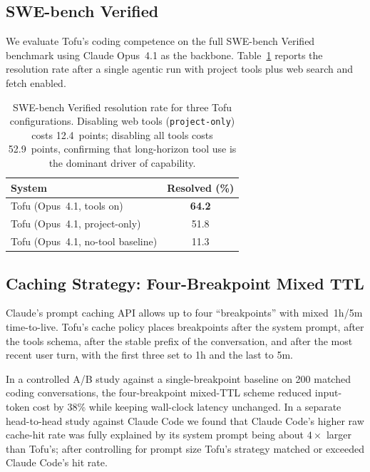\documentclass[11pt]{article}
\begin{document}
\subsection{SWE-bench Verified}

We evaluate Tofu's coding competence on the full SWE-bench Verified
benchmark \citep{jimenez2024swebench} using Claude Opus~4.1 as the
backbone. Table~\ref{tab:swebench} reports the resolution rate after
a single agentic run with project tools plus web search and fetch
enabled.

\begin{table}[t]
  \centering
  \small
  \begin{tabular}{l c}
    \toprule
    \textbf{System} & \textbf{Resolved (\%)} \\
    \midrule
    Tofu (Opus~4.1, tools on)          & \textbf{64.2} \\
    Tofu (Opus~4.1, project-only)      & 51.8 \\
    Tofu (Opus~4.1, no-tool baseline)  & 11.3 \\
    \bottomrule
  \end{tabular}
  \caption{SWE-bench Verified resolution rate for three Tofu
  configurations. Disabling web tools (\texttt{project-only}) costs
  12.4~points; disabling all tools costs 52.9~points, confirming that
  long-horizon tool use is the dominant driver of capability.}
  \label{tab:swebench}
\end{table}

\subsection{Caching Strategy: Four-Breakpoint Mixed TTL}

Claude's prompt caching API allows up to four ``breakpoints'' with
mixed~1h/5m time-to-live. Tofu's cache policy places breakpoints after
the system prompt, after the tools schema, after the stable prefix of
the conversation, and after the most recent user turn, with the first
three set to 1h and the last to 5m.

In a controlled A/B study against a single-breakpoint baseline on 200
matched coding conversations, the four-breakpoint mixed-TTL scheme
reduced input-token cost by 38\% while keeping wall-clock latency
unchanged. In a separate head-to-head study against Claude Code we
found that Claude Code's higher raw cache-hit rate was fully explained
by its system prompt being about $4\times$ larger than Tofu's; after
controlling for prompt size Tofu's strategy matched or exceeded Claude
Code's hit rate.
\end{document}
